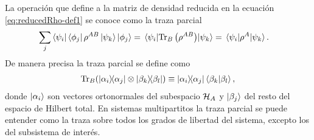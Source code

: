 La operación que define a la matriz de densidad reducida en 
la ecuación \eqref{eq:reducedRho-def1} se conoce como la traza parcial
\begin{align} 
	\sum _j \bra{\psi_i}\bra{\phi_j}\rho^{AB}\ket{\psi_k}\ket{\phi_j}
	&=\matrixel{\psi_i}{\Tr_B\qty(\rho^{AB})}{\psi_k}
	= \matrixel{\psi_i}{\rho^A}{\psi_k}.
	\label{eq:partialTrace-def}
\end{align}
De manera precisa la traza parcial se define como \cite{nielsen_chuang_2011}
\begin{align}
	\Tr_B (\dyad{\alpha_i}{\alpha_j}\otimes \dyad{\beta_k}{\beta_l})
	\equiv
	\dyad{\alpha_i}{\alpha_j}\braket{\beta_k}{\beta_l},
	\label{eq:part_trace-def}
\end{align}
donde $\ket{\alpha_i}$ son vectores ortonormales del subespacio $\mathcal{H}_A$
y $\ket{\beta_j}$ del resto del espacio de Hilbert total. En sistemas 
multipartitos la traza parcial se puede entender como la traza sobre 
todos los grados de libertad del sistema, excepto los del subsistema de interés. 


